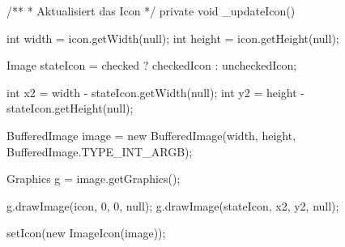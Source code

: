 \begin{spacing}{0.75}
\begin{javacode}[firstnumber=20]
  
  /**
  * Aktualisiert das Icon
  */
  private void _updateIcon()
  {
    int width = icon.getWidth(null);
    int height = icon.getHeight(null);
    
    Image stateIcon = checked ? checkedIcon : uncheckedIcon;
    
    int x2 = width - stateIcon.getWidth(null);
    int y2 = height - stateIcon.getHeight(null);
    
    BufferedImage image = new BufferedImage(width, height, BufferedImage.TYPE_INT_ARGB);
    
    Graphics g = image.getGraphics();
    
    g.drawImage(icon, 0, 0, null);
    g.drawImage(stateIcon, x2, y2, null);
    
    setIcon(new ImageIcon(image));
  }
\end{javacode}
\end{spacing}